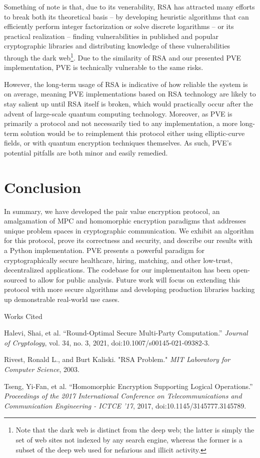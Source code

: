 \documentclass{article}
\newcommand{\bibent}{\noindent \hangindent 40pt}
\newenvironment{workscited}{\vspace{-0.5cm}\begin{center} Works Cited \end{center}}{\newpage }
\begin{document}
\begin{multicols}{2}
Something of note is that, due to its venerability, RSA has attracted many efforts to break both its theoretical basis – by developing heuristic algorithms that can efficiently perform integer factorization or solve discrete logarithms – or its practical realization – finding vulnerabilities in published and popular cryptographic libraries and distributing knowledge of these vulnerabilities through the dark web\footnote{Note that the dark web is distinct from the deep web; the latter is simply the set of web sites not indexed by any search engine, whereas the former is a subset of the deep web used for nefarious and illicit activity.}. Due to the similarity of RSA and our presented PVE implementation, PVE is technically vulnerable to the same risks.

However, the long-term usage of RSA is indicative of how reliable the system is on average, meaning PVE implementations based on RSA technology are likely to stay salient up until RSA itself is broken, which would practically occur after the advent of large-scale quantum computing technology. Moreover, as PVE is primarily a protocol and not necessarily tied to any implementation, a more long-term solution would be to reimplement this protocol either using elliptic-curve fields, or with quantum encryption techniques themselves. As such, PVE's potential pitfalls are both minor and easily remedied.

\section{Conclusion}

In summary, we have developed the pair value encryption protocol, an amalgamation of MPC and homomorphic encryption paradigms that addresses unique problem spaces in cryptographic communication. We exhibit an algorithm for this protocol, prove its correctness and security, and describe our results with a Python implementation. PVE presents a powerful paradigm for cryptographically secure healthcare, hiring, matching, and other low-trust, decentralized applications. The codebase for our implementaiton has been open-sourced to allow for public analysis. Future work will focus on extending this protocol with more secure algorithms and developing production libraries backing up demonstrable real-world use cases.

\end{multicols}

\begin{workscited}

\bibent
Halevi, Shai, et al. “Round-Optimal Secure Multi-Party Computation.” \textit{Journal of Cryptology}, vol. 34, no. 3, 2021, doi:10.1007/s00145-021-09382-3.

\bibent
Rivest, Ronald L., and Burt Kaliski. "RSA Problem." \textit{MIT Laboratory for Computer Science}, 2003.

\bibent
Tseng, Yi-Fan, et al. “Homomorphic Encryption Supporting Logical Operations.” \textit{Proceedings of the 2017 International Conference on Telecommunications and Communication Engineering - ICTCE '17}, 2017, doi:10.1145/3145777.3145789.

\end{workscited}
\end{document}
